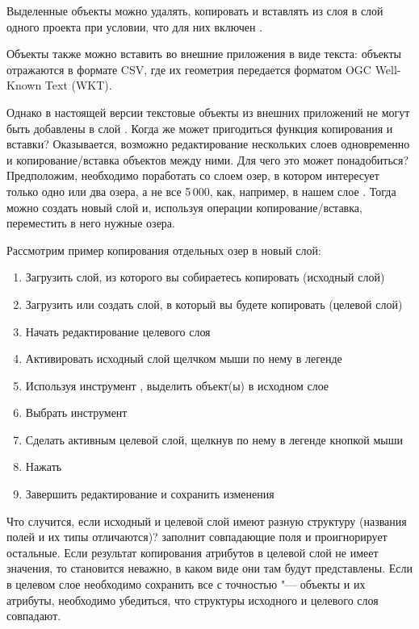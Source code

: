 Выделенные объекты можно удалять, копировать и вставлять из слоя в слой
одного проекта \qg  при условии, что для них включен
.

Объекты также можно вставить во внешние приложения в виде текста: объекты
отражаются в формате  CSV, где их геометрия передается форматом
OGC Well-Known Text (WKT).

Однако в настоящей версии  \qg текстовые объекты из внешних приложений
\qg не могут быть добавлены в слой \qg. Когда же может пригодиться функция
копирования и вставки? Оказывается, возможно редактирование нескольких
слоев одновременно и копирование/вставка объектов между ними. Для чего это
может понадобиться? Предположим, необходимо поработать со слоем озер, в
котором интересует только одно или два озера, а не все 5\,000, как, например,
в нашем слое . Тогда можно создать новый слой и,
используя операции копирование/вставка, переместить в него нужные озера.

Рассмотрим пример копирования отдельных озер в новый слой:

\begin{enumerate}
\item Загрузить слой, из которого вы собираетесь копировать (исходный слой)
\item Загрузить или создать слой, в который вы будете копировать (целевой слой)
\item Начать редактирование целевого слоя
\item Активировать исходный слой щелчком мыши по нему в легенде
\item Используя инструмент ,
выделить объект(ы) в исходном слое
\item Выбрать инструмент 
\item Сделать активным целевой слой, щелкнув по нему в легенде кнопкой мыши
\item Нажать 
\item Завершить редактирование и сохранить изменения
\end{enumerate}

Что случится, если исходный и целевой слой имеют разную структуру (названия
полей и их типы отличаются)? \qg заполнит совпадающие поля и проигнорирует
остальные. Если результат копирования атрибутов в целевой слой не имеет
значения, то становится неважно, в каком виде они там будут представлены.
Если в целевом слое необходимо сохранить все с точностью "--- объекты и
их атрибуты, необходимо убедиться, что структуры исходного и целевого слоя
совпадают.

